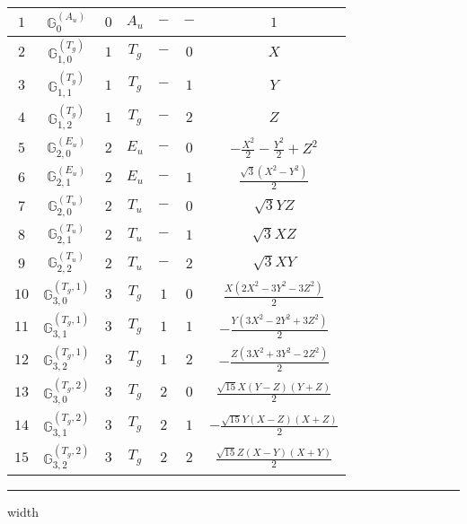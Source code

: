 \documentclass[fleqn,10pt,landscape]{article}
\begin{document}
\begin{itemize}
\begin{center}
\begin{longtable}{ccccccc}
$ 1 $ & $ \mathbb{G}_{0}^{(A_{u})} $ & $ 0 $ & $ A_{u} $ & $ - $ & $ - $ & $ 1 $ \\ \hline
$ 2 $ & $ \mathbb{G}_{1,0}^{(T_{g})} $ & $ 1 $ & $ T_{g} $ & $ - $ & $ 0 $ & $ X $ \\
$ 3 $ & $ \mathbb{G}_{1,1}^{(T_{g})} $ & $ 1 $ & $ T_{g} $ & $ - $ & $ 1 $ & $ Y $ \\
$ 4 $ & $ \mathbb{G}_{1,2}^{(T_{g})} $ & $ 1 $ & $ T_{g} $ & $ - $ & $ 2 $ & $ Z $ \\ \hline
$ 5 $ & $ \mathbb{G}_{2,0}^{(E_{u})} $ & $ 2 $ & $ E_{u} $ & $ - $ & $ 0 $ & $ - \frac{X^{2}}{2} - \frac{Y^{2}}{2} + Z^{2} $ \\
$ 6 $ & $ \mathbb{G}_{2,1}^{(E_{u})} $ & $ 2 $ & $ E_{u} $ & $ - $ & $ 1 $ & $ \frac{\sqrt{3} \left(X^{2} - Y^{2}\right)}{2} $ \\
$ 7 $ & $ \mathbb{G}_{2,0}^{(T_{u})} $ & $ 2 $ & $ T_{u} $ & $ - $ & $ 0 $ & $ \sqrt{3} Y Z $ \\
$ 8 $ & $ \mathbb{G}_{2,1}^{(T_{u})} $ & $ 2 $ & $ T_{u} $ & $ - $ & $ 1 $ & $ \sqrt{3} X Z $ \\
$ 9 $ & $ \mathbb{G}_{2,2}^{(T_{u})} $ & $ 2 $ & $ T_{u} $ & $ - $ & $ 2 $ & $ \sqrt{3} X Y $ \\ \hline
$ 10 $ & $ \mathbb{G}_{3,0}^{(T_{g},1)} $ & $ 3 $ & $ T_{g} $ & $ 1 $ & $ 0 $ & $ \frac{X \left(2 X^{2} - 3 Y^{2} - 3 Z^{2}\right)}{2} $ \\
$ 11 $ & $ \mathbb{G}_{3,1}^{(T_{g},1)} $ & $ 3 $ & $ T_{g} $ & $ 1 $ & $ 1 $ & $ - \frac{Y \left(3 X^{2} - 2 Y^{2} + 3 Z^{2}\right)}{2} $ \\
$ 12 $ & $ \mathbb{G}_{3,2}^{(T_{g},1)} $ & $ 3 $ & $ T_{g} $ & $ 1 $ & $ 2 $ & $ - \frac{Z \left(3 X^{2} + 3 Y^{2} - 2 Z^{2}\right)}{2} $ \\
$ 13 $ & $ \mathbb{G}_{3,0}^{(T_{g},2)} $ & $ 3 $ & $ T_{g} $ & $ 2 $ & $ 0 $ & $ \frac{\sqrt{15} X \left(Y - Z\right) \left(Y + Z\right)}{2} $ \\
$ 14 $ & $ \mathbb{G}_{3,1}^{(T_{g},2)} $ & $ 3 $ & $ T_{g} $ & $ 2 $ & $ 1 $ & $ - \frac{\sqrt{15} Y \left(X - Z\right) \left(X + Z\right)}{2} $ \\
$ 15 $ & $ \mathbb{G}_{3,2}^{(T_{g},2)} $ & $ 3 $ & $ T_{g} $ & $ 2 $ & $ 2 $ & $ \frac{\sqrt{15} Z \left(X - Y\right) \left(X + Y\right)}{2} $ \\
\end{longtable}
\end{center}

 \hfil \hrule height 1mm width \textwidth \hfil


\end{itemize}
\end{document}
